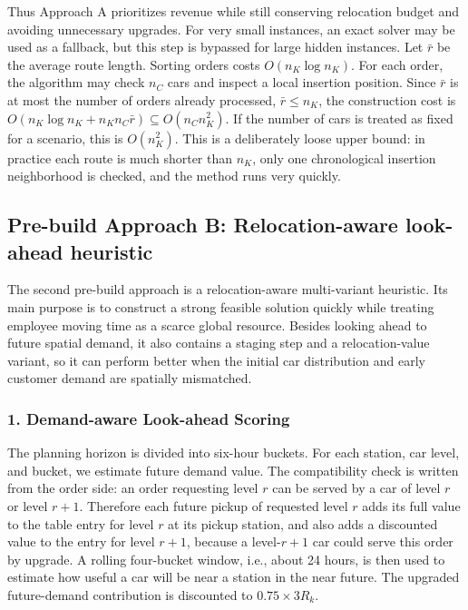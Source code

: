\documentclass[10pt,a4paper]{article}
\begin{document}
Thus Approach A prioritizes revenue while still conserving relocation budget and
avoiding unnecessary upgrades.  For very small instances, an exact solver may be
used as a fallback, but this step is bypassed for large hidden instances.  Let
$\bar r$ be the average route length.  Sorting orders costs $O(n_K\log n_K)$.
For each order, the algorithm may check $n_C$ cars and inspect a local insertion
position.  Since $\bar r$ is at most the number of orders already processed,
$\bar r\le n_K$, the construction cost is
$O(n_K\log n_K+n_Kn_C\bar r)\subseteq O(n_Cn_K^2)$.
If the number of cars is treated as fixed for a scenario, this is $O(n_K^2)$.
This is a deliberately loose upper bound: in practice each route is much shorter
than $n_K$, only one chronological insertion neighborhood is checked, and the
method runs very quickly.

\subsection*{Pre-build Approach B: Relocation-aware look-ahead heuristic}

The second pre-build approach is a relocation-aware multi-variant heuristic.  Its
main purpose is to construct a strong feasible solution quickly while treating
employee moving time as a scarce global resource.  Besides looking ahead to
future spatial demand, it also contains a staging step and a relocation-value
variant, so it can perform better when the initial car distribution and early
customer demand are spatially mismatched.

\subsubsection*{1. Demand-aware Look-ahead Scoring}

The planning horizon is divided into six-hour buckets.  For each station, car
level, and bucket, we estimate future demand value.  The compatibility check is
written from the order side: an order requesting level $r$ can be served by a
car of level $r$ or level $r+1$.  Therefore each future pickup of requested
level $r$ adds its full value to the table entry for level $r$ at its pickup
station, and also adds a discounted value to the entry for level $r+1$, because
a level-$r+1$ car could serve this order by upgrade.  A rolling four-bucket
window, i.e., about 24 hours, is then used to estimate how useful a car will be
near a station in the near future.  The upgraded future-demand contribution is
discounted to $0.75\times 3R_k$.
\end{document}
